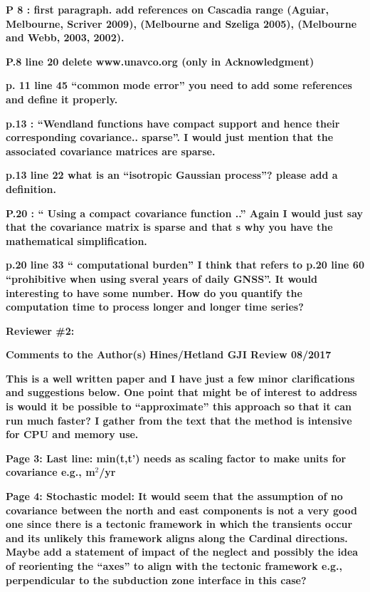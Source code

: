 \documentclass[10pt,a4paper]{letter}
\begin{document}
\begin{letter}{}
\textbf{P 8 : first paragraph. add references on Cascadia range (Aguiar,
Melbourne, Scriver 2009), (Melbourne and Szeliga 2005), (Melbourne and
Webb, 2003, 2002).}

\textbf{P.8 line 20 delete www.unavco.org (only in Acknowledgment)}

\textbf{p. 11 line 45 “common mode error” you need to add some references and
define it properly.}

\textbf{p.13 : “Wendland functions have compact support and hence their
corresponding covariance.. sparse”. I would just mention that the
associated covariance matrices are sparse.}

\textbf{p.13 line 22 what is an “isotropic Gaussian process”? please add a
definition.}

\textbf{P.20 : “ Using a compact covariance function ..” Again I would just
say that the covariance matrix is sparse and that s why you have the
mathematical simplification.}

\textbf{p.20 line 33 “ computational burden” I think that refers to p.20 line
60 “prohibitive when using sveral years of daily GNSS”. It would
interesting to have some number. How do you quantify the computation
time to process longer and longer time series?}



\textbf{Reviewer \#2:}\newline

\textbf{Comments to the Author(s)}
\textbf{Hines/Hetland GJI Review 08/2017}

\textbf{This is a well written paper and I have just a few minor
clarifications and suggestions below.  One point that might be of
interest to address is would it be possible to “approximate” this
approach so that it can run much faster?  I gather from the text that
the method is intensive for CPU and memory use.}

\textbf{Page 3: Last line: min(t,t’) needs as scaling factor to make units for
covariance e.g., m$^2$/yr}

\textbf{Page 4: Stochastic model: It would seem that the assumption of no
covariance between the north and east components is not a very good
one since there is a tectonic framework in which the transients occur
and its unlikely this framework aligns along the Cardinal directions.
Maybe add a statement of impact of the neglect and possibly the idea
of reorienting the “axes” to align with the tectonic framework e.g.,
perpendicular to the subduction zone interface in this case?}


\end{letter}
\end{document}
